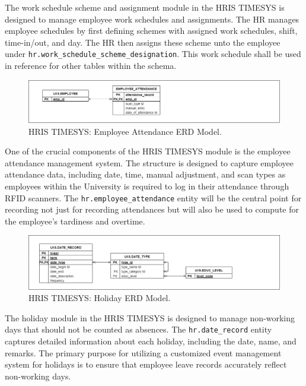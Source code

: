     The work schedule scheme and assignment module in the HRIS TIMESYS is designed to manage employee work schedules and assignments. The HR manages employee schedules by first defining schemes with assigned work schedules, shift, time-in/out, and day. The HR then assigns these scheme unto the employee under \texttt{hr.work\_schedule\_scheme\_designation}. This work schedule shall be used in reference for other tables within the schema.

    \begin{figure}[H]
        \centering
        \includegraphics[width=1\linewidth]{figures/images/diagrams/erd/erd-timesys-employee-attendance.png}
        \caption{HRIS TIMESYS: Employee Attendance ERD Model.}
        \label{fig:erd-timesys-employee-attendance}
    \end{figure}

    One of the crucial components of the HRIS TIMESYS module is the employee attendance management system. The structure is designed to capture employee attendance data, including date, time, manual adjustment, and scan types as employees within the University is required to log in their attendance through RFID scanners. The \texttt{hr.employee\_attendance} entity will be the central point for recording not just for recording attendances but will also be used to compute for the employee's tardiness and overtime.

    \begin{figure}[H]
        \centering
        \includegraphics[width=1\linewidth]{figures/images/diagrams/erd/erd-timesys-holiday.png}
        \caption{HRIS TIMESYS: Holiday ERD Model.}
        \label{fig:erd-timesys-holiday}
    \end{figure}

    The holiday module in the HRIS TIMESYS is designed to manage non-working days that should not be counted as absences. The \texttt{hr.date\_record} entity captures detailed information about each holiday, including the date, name, and remarks. The primary purpose for utilizing a customized event management system for holidays is to ensure that employee leave records accurately reflect non-working days. 


